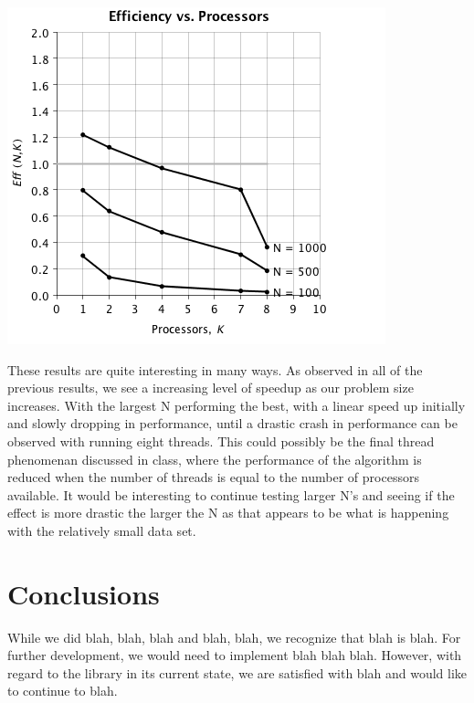 \documentclass{dependencies/acm_proc_article-sp}
\begin{document}
\begin{center}
\includegraphics[scale=0.5]{images/matrix-inversion/eff-vs-proc.png}
\end{center}

These results are quite interesting in many ways. As observed in all of the
previous results, we see a increasing level of speedup as our problem size
increases. With the largest N performing the best, with a linear
speed up initially and slowly dropping in performance, until a drastic
crash in performance can be observed with running eight threads. This could
possibly be the final thread phenomenan discussed in class, where the
performance of the algorithm is reduced when the number of threads is equal
to the number of processors available. It would be interesting to continue
testing larger N's and seeing if the effect is more drastic the larger the N
as that appears to be what is happening with the relatively small data set.
\section{Conclusions}

While we did blah, blah, blah and blah, blah, we recognize that blah is blah. For further development, we would need to implement blah blah blah. However, with regard to the library in its current state, we are satisfied with blah and would like to continue to blah.

\newpage

\newpage
%

%
%
\balancecolumns
\end{document}
